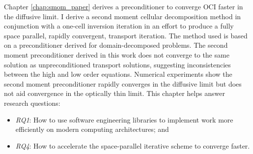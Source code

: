 Chapter \ref{chap:smom_paper} derives a preconditioner to converge OCI faster in the diffusive limit.
I derive a second moment cellular decomposition method in conjunction with a one-cell inversion iteration in an effort to produce a fully space parallel, rapidly convergent, transport iteration.
The method used is based on a preconditioner derived for domain-decomposed problems.
The second moment preconditioner derived in this work does not converge to the same solution as unpreconditioned transport solutions, suggesting inconsistencies between the high and low order equations.
Numerical experiments show the second moment preconditioner rapidly converges in the diffusive limit but does not aid convergence in the optically thin limit.
This chapter helps answer research questions:
\begin{itemize}
    \item \emph{RQ1}: How to use software engineering libraries to implement work more efficiently on modern computing architectures; and
    \item \emph{RQ4}: How to accelerate the space-parallel iterative scheme to converge faster.
\end{itemize}


